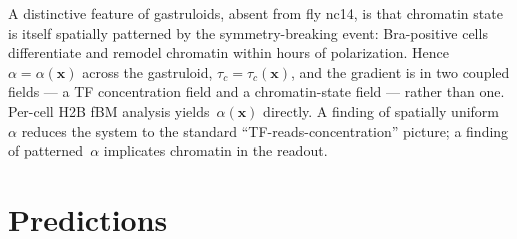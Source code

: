 \documentclass[11pt]{article}
\begin{document}
A distinctive feature of gastruloids, absent from fly nc14, is that
chromatin state is itself spatially patterned by the symmetry-breaking
event: Bra-positive cells differentiate and remodel chromatin within hours
of polarization. Hence~$\alpha = \alpha(\mathbf{x})$ across the gastruloid,
$\tau_c = \tau_c(\mathbf{x})$, and the gradient is in two coupled fields ---
a TF concentration field and a chromatin-state field --- rather than one.
Per-cell H2B fBM analysis yields~$\alpha(\mathbf{x})$ directly. A finding of
spatially uniform~$\alpha$ reduces the system to the standard
``TF-reads-concentration'' picture; a finding of patterned~$\alpha$
implicates chromatin in the readout.

\section{Predictions}
\label{sec:predictions}
\end{document}

